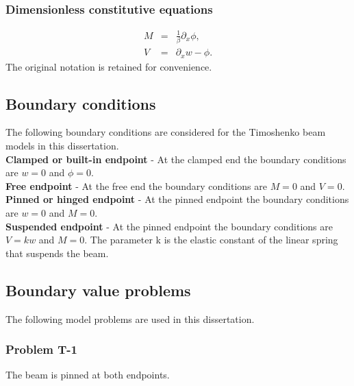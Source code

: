 \documentclass[../../main.tex]{subfiles}
\begin{document}
    \subsubsection*{Dimensionless constitutive equations}\label{sssec:1D_Model:DimensionlessConstitutiveEquations}
    \begin{eqnarray}
        M &=& \frac{1}{\beta}\partial_x \phi, \label{eq:1D_Model:ConstitutiveEquations1D}\\
        V &=& \partial_x w-\phi. \label{eq:1D_Model:ConstitutiveEquations2D}
    \end{eqnarray}
    The original notation is retained for convenience.

    \subsection{Boundary conditions}\label{ssec:1D_Model:BoundaryConditions}
    The following boundary conditions are considered for the Timoshenko beam models in this dissertation.\\

    \textbf{Clamped or built-in endpoint} - At the clamped end the boundary conditions are $w = 0$ and $\phi = 0$.\\

    \textbf{Free endpoint} - At the free end the boundary conditions are $M = 0$ and $V = 0$.\\

    \textbf{Pinned or hinged endpoint} - At the pinned endpoint the boundary conditions are $w = 0$ and $M = 0$.\\

    \textbf{Suspended endpoint} - At the pinned endpoint the boundary conditions are $V = kw$ and $M = 0$. The parameter k is the elastic constant of the linear spring that suspends the beam.

    \subsection{Boundary value problems}\label{ssec:1D_Model:ModelProblems}
    The following model problems are used in this dissertation.

    \subsubsection*{Problem T-1}\label{sssec:1D_Model:ProblemT1}
    The beam is pinned at both endpoints.\\
\end{document}
